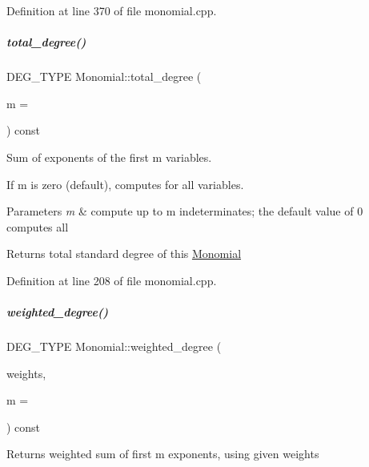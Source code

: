 Definition at line 370 of file monomial.\+cpp.

\mbox{\label{group__polygroup_afe6df62857d9f58634d5f6c668f12d35}} 
\subparagraph{\texorpdfstring{total\+\_\+degree()}{total\_degree()}}
{\footnotesize\ttfamily D\+E\+G\+\_\+\+T\+Y\+PE Monomial\+::total\+\_\+degree (\begin{DoxyParamCaption}\item[{N\+V\+A\+R\+\_\+\+T\+Y\+PE}]{m = {} }\end{DoxyParamCaption}) const}



Sum of exponents of the first {\ttfamily m} variables. 

If {\ttfamily m} is zero (default), computes for all variables. 
\begin{DoxyParams}{Parameters}
{\em m} & compute up to {\ttfamily m} indeterminates; the default value of 0 computes all \\
\hline
\end{DoxyParams}
\begin{DoxyReturn}{Returns}
total standard degree of this \hyperlink{group__polygroup_class_monomial}{Monomial} 
\end{DoxyReturn}


Definition at line 208 of file monomial.\+cpp.

\mbox{\label{group__polygroup_a5b19863967dc9801997d2d1058f312a3}} 
\subparagraph{\texorpdfstring{weighted\+\_\+degree()}{weighted\_degree()}}
{\footnotesize\ttfamily D\+E\+G\+\_\+\+T\+Y\+PE Monomial\+::weighted\+\_\+degree (\begin{DoxyParamCaption}\item[{const W\+T\+\_\+\+T\+Y\+PE $\ast$}]{weights,  }\item[{N\+V\+A\+R\+\_\+\+T\+Y\+PE}]{m = {} }\end{DoxyParamCaption}) const}

\begin{DoxyReturn}{Returns}
weighted sum of first {\ttfamily m} exponents, using given {\ttfamily weights} 
\end{DoxyReturn}

